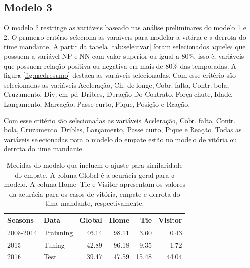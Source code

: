 \documentclass[review]{elsarticle}
\begin{document}
\subsection{Modelo 3}
\label{sec:mod3}

O modelo 3 restringe as variáveis baseado nas análise preliminares do modelo 1 e 2. O primeiro critério seleciona as variáveis para modelar a vitória e a derrota do time mandante. A partir da tabela \ref{tab:selectvar} foram selecionados aqueles que possuem a variável NP e NN com valor superior ou igual a $80\%$, isso é, variáveis que possuem relação positiva ou negativa em mais de $80\%$ das temporadas. A figura \ref{fig:medresumo} destaca as variáveis selecionadas. Com esse critério são selecionadas as variáveis Aceleração, Ch. de longe, Cobr. falta, Contr. bola, Cruzamento, Div. em pé, Dribles, Duração Do Contrato, Força chute, Idade, Lançamento, Marcação, Passe curto, Pique, Posição e Reação.

 
Com esse critério são selecionadas as variáveis Aceleração, Cobr. falta, Contr. bola, Cruzamento, Dribles, Lançamento, Passe curto, Pique e  Reação. Todas as variáveis selecionadas para o modelo do empate estão no modelo de vitória ou derrota do time mandante.


\begin{table}[!h]
\centering
\scriptsize
\begin{tabular}{llrrrr}
  \hline
Seasons & Data & \textbf{Global} & Home & Tie & Visitor \\ 
  \hline
2008-2014 & Trainning & 46.14 & 98.11 & 3.60 & 0.43 \\ 
  2015 & Tuning & 42.89 & 96.18 & 9.35 & 1.72 \\ 
  2016 & Test & 39.47 & 47.59 & 15.48 & 44.04 \\ 
   \hline
\end{tabular}
    \caption[\scriptsize{Medidas do modelo com seleção e similidade.}]{\scriptsize{Medidas do modelo que incluem o ajuste para similaridade do empate. A coluna Global é a acurácia geral para o modelo. A coluna Home, Tie e Visitor apresentam os valores da acurácia para os casos de vitória, empate e derrota do time mandante, respectivamente. }}
    \label{tab:medidasmodsisele}
\end{table}
\end{document}
